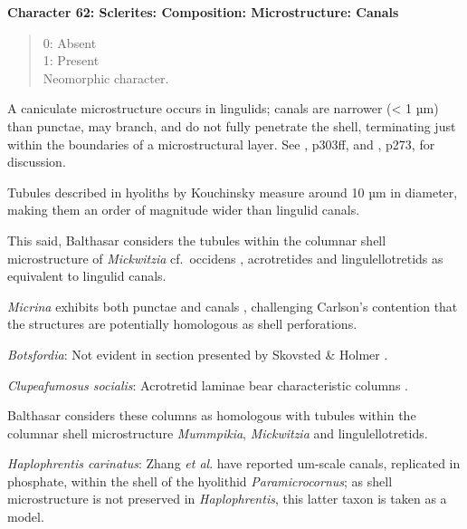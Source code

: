 \documentclass[openany]{book}
\theoremstyle{definition}
\theoremstyle{definition}
\theoremstyle{definition}
\theoremstyle{remark}
\begin{document}
\textbf{Character 62: Sclerites: Composition: Microstructure: Canals}

\begin{quote}
0: Absent\\
1: Present\\
Neomorphic character.
\end{quote}

A caniculate microstructure occurs in lingulids; canals are narrower
(\textless{} 1 µm) than punctae, may branch, and do not fully penetrate
the shell, terminating just within the boundaries of a microstructural
layer. See \citet{Williams1997Introduction}, p303ff, and
\citet{Balthasar2008iMummpikia}, p273, for discussion.

Tubules described in hyoliths by Kouchinsky
\citeyearpar{Kouchinsky2000Skeletalmicrostructures} measure around 10 µm
in diameter, making them an order of magnitude wider than lingulid
canals.

This said, Balthasar \citeyearpar{Balthasar2008iMummpikia} considers the
tubules within the columnar shell microstructure of \emph{Mickwitzia}
cf.~occidens \citep[1--3 µm wide,][]{Skovsted2003EarlyCambrian},
acrotretides \citep[1 µm wide,
see][\citet{Zhang2016Epithelialcell}]{Holmer1989MiddleOrdovician} and
lingulellotretids \citep[100 nm wide,][]{Cusack1999Chemicostructural} as
equivalent to lingulid canals.

\emph{Micrina} exhibits both punctae and canals
\citep{Harper2017Brachiopodsorigin}, challenging Carlson's contention
\citep[in][]{Williams2007Supplement} that the structures are potentially
homologous as shell perforations.

\hypertarget{Botsfordia-coding-62}{}
\emph{Botsfordia}: Not evident in section presented by Skovsted \&
Holmer \citeyearpar{Skovsted2003EarlyCambrian}.

\hypertarget{Clupeafumosus_socialis-coding-62}{}
\emph{Clupeafumosus socialis}: Acrotretid laminae bear characteristic
columns \citep[e.g.][]{Zhang2016Epithelialcell}.

Balthasar \citeyearpar{Balthasar2008iMummpikia} considers these columns
as homologous with tubules within the columnar shell microstructure
\emph{Mummpikia}, \emph{Mickwitzia} and lingulellotretids.

\hypertarget{Haplophrentis_carinatus-coding-62}{}
\emph{Haplophrentis carinatus}: Zhang \emph{et al}.
\citeyearpar{Zhang2018Ahyolithid} have reported um-scale canals,
replicated in phosphate, within the shell of the hyolithid
\emph{Paramicrocornus}; as shell microstructure is not preserved in
\emph{Haplophrentis}, this latter taxon is taken as a model.
\end{document}
